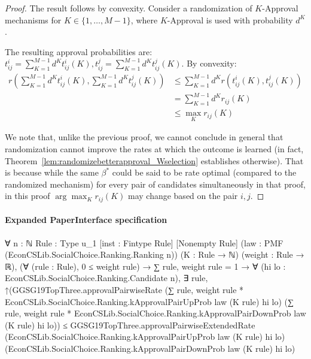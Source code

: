 \documentclass[10pt]{article}
\begin{document}
\begin{ReviewVerbatim}
\begin{proof}
	The result follows by convexity. Consider a randomization of $K$-Approval mechanisms for $K\in\{1, \dots, M-1\}$, where $K$-Approval is used with probability $d^K$.

%

	The resulting approval probabilities are: $t^i_{ij} = \sum_{K=1}^{M-1} d^K t^i_{ij}(K), t^j_{ij} = \sum_{K=1}^{M-1} d^K t^j_{ij}(K)$. By convexity:
	\begin{align*}
	r\left(\sum_{K=1}^{M-1} d^K t^i_{ij}(K), \sum_{K=1}^{M-1} d^K t^j_{ij}(K)\right) &\leq \sum_{K=1}^{M-1} d^K r\left(t^i_{ij}(K), t^j_{ij}(K)\right)\\
	&= \sum_{K=1}^{M-1} d^K  r_{ij}(K)\\
	&\leq \max_K r_{ij}(K)
	\end{align*}

We note that, unlike the previous proof, we cannot conclude in general that randomization cannot improve the rates at which the outcome is learned (in fact, Theorem~\ref{lem:randomizebetterapproval_Wselection} establishes otherwise). That is because while the same $\beta^*$ could be said to be rate optimal (compared to the randomized mechanism) for every pair of candidates simultaneously in that proof, in this proof $\arg\max_K r_{ij}(K)$ may change based on the pair $i,j$.

\end{proof}
\end{ReviewVerbatim}


\paragraph{Expanded PaperInterface specification}
\begin{ReviewVerbatim}
∀ {n : ℕ} {Rule : Type u_1} [inst : Fintype Rule] [Nonempty Rule] (law : PMF (EconCSLib.SocialChoice.Ranking.Ranking n))
  (K : Rule → ℕ) (weight : Rule → ℝ),
  (∀ (rule : Rule), 0 ≤ weight rule) →
    ∑ rule, weight rule = 1 →
      ∀ (hi lo : EconCSLib.SocialChoice.Ranking.Candidate n),
        ∃ rule,
          ↑(GGSG19TopThree.approvalPairwiseRate
                (∑ rule, weight rule * EconCSLib.SocialChoice.Ranking.kApprovalPairUpProb law (K rule) hi lo)
                (∑ rule, weight rule * EconCSLib.SocialChoice.Ranking.kApprovalPairDownProb law (K rule) hi lo)) ≤
            GGSG19TopThree.approvalPairwiseExtendedRate
              (EconCSLib.SocialChoice.Ranking.kApprovalPairUpProb law (K rule) hi lo)
              (EconCSLib.SocialChoice.Ranking.kApprovalPairDownProb law (K rule) hi lo)
\end{ReviewVerbatim}
\end{document}
